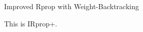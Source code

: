 \begin{subsection}{Improved Rprop with Weight-Backtracking}
    \par This is IRprop+.
\end{subsection}